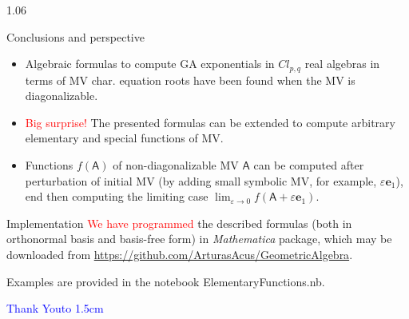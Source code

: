 \documentclass[xcolor=table,hyperref={pdfpagemode=FullScreen}]{beamer}
\newcommand{\cl}[2]{\ensuremath{\mathit{Cl}_{#1,#2}}} %
\newcommand{\e}[1]{\mathbf{e}_{#1}} %
\def\m#1{\mathsf{#1}} %
\def\m#1{\mathsf{#1}}%
\newcommand{\red}[1]{\textcolor{red}{#1}}
\newcommand{\blue}[1]{\textcolor{blue}{#1}}
\begin{document}
\begin{frame}
\vspace{-20pt}
\begin{columns}[t]
\begin{column}{1.06\textwidth}
\begin{block}{Conclusions and perspective}
\begin{itemize}\small
  \item <1->  Algebraic formulas to compute GA exponentials in  $\cl{p}{q}$ real algebras
   in terms of MV char. equation roots have been found when the MV is  diagonalizable. 
 \item <2->  \red{Big surprise!} The presented formulas can be extended to compute arbitrary elementary and special functions of MV.
 \item <3->  Functions $f(\m{A})$ of non-diagonalizable MV $\m{A}$ can be computed after perturbation of initial MV
  (by adding small symbolic MV, for example, $\varepsilon\e{1}$), end then computing the limiting case
   $\lim_{\varepsilon\to 0} f(\m{A}+\varepsilon\e{1})$.
\end{itemize}
\end{block}

\begin{block}{Implementation} 
  \red{We have programmed} the described formulas (both in orthonormal basis and basis-free form) in {\it Mathematica} package, 
  which may be downloaded from 
  \blue{\url{https://github.com/ArturasAcus/GeometricAlgebra}}. 

\scriptsize Examples are provided in the notebook ElementaryFunctions.nb.
\end{block}
  \begin{flushright}\vskip -15pt  \Huge \blue{Thank You\hbox to 1.5cm{}}
\end{flushright}

\end{column}
\end{columns}
\end{frame}


\end{document}
